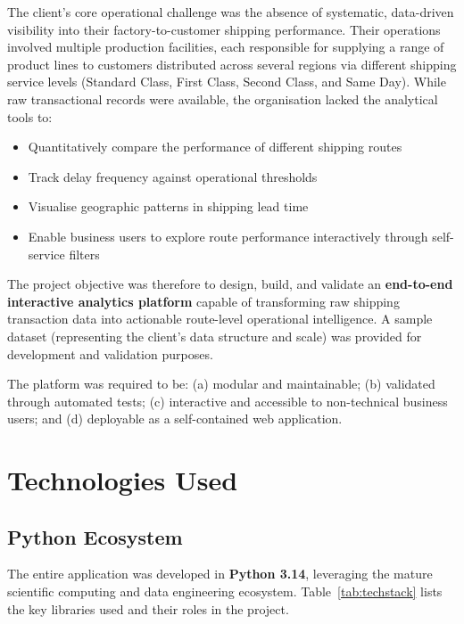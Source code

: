 \documentclass[12pt, a4paper]{report}
\begin{document}
The client's core operational challenge was the absence of systematic,
data-driven visibility into their factory-to-customer shipping performance.
Their operations involved multiple production facilities, each responsible
for supplying a range of product lines to customers distributed across
several regions via different shipping service levels (Standard Class,
First Class, Second Class, and Same Day). While raw transactional records
were available, the organisation lacked the analytical tools to:

\begin{itemize}[leftmargin=1.5em, itemsep=4pt]
  \item Quantitatively compare the performance of different shipping routes
  \item Track delay frequency against operational thresholds
  \item Visualise geographic patterns in shipping lead time
  \item Enable business users to explore route performance interactively
    through self-service filters
\end{itemize}

The project objective was therefore to design, build, and validate an
\textbf{end-to-end interactive analytics platform} capable of transforming
raw shipping transaction data into actionable route-level operational
intelligence. A sample dataset (representing the client's data structure
and scale) was provided for development and validation purposes.

The platform was required to be:
(a) modular and maintainable; (b) validated through automated tests;
(c) interactive and accessible to non-technical business users; and
(d) deployable as a self-contained web application.

\section{Technologies Used}

\subsection{Python Ecosystem}

The entire application was developed in \textbf{Python 3.14}, leveraging the
mature scientific computing and data engineering ecosystem. Table~\ref{tab:techstack}
lists the key libraries used and their roles in the project.
\end{document}
